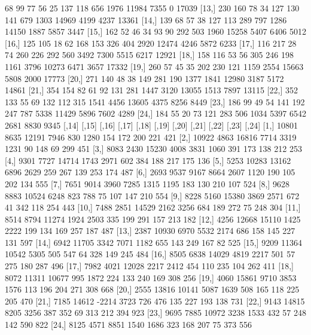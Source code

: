 \documentclass[a4paper]{ article}
\begin{document}
\begin{table}[H]
\begin{Schunk}
\begin{Soutput}
[12,]   68   99   77   56   25  137  118  656 1976 11984  7355     0 17039
[13,]  230  160   78   34  127  130  141  679 1303 14969  4199  4237 13361
[14,]  139   68   57   38  127  113  289  797 1286 14150  1887  5857  3447
[15,]  162   52   46   34   93   90  292  503 1960 15258  5407  6406  5012
[16,]  125  105   18   62  168  153  326  404 2920 12474  4246  5872  6233
[17,]  116  217   28   74  260  226  292  560 3492  7300  5515  6217 12921
[18,]  158  116   53   56  305  246  198 1161 3796 10273  6471  3657 17332
[19,]  260   57   45   35  202  230  121 1159 2554 15663  5808  2000 17773
[20,]  271  140   48   38  149  281  190 1377 1841 12980  3187  5172 14861
[21,]  354  154   82   61   92  131  281 1447 3120 13055  1513  7897 13115
[22,]  352  133   55   69  132  112  315 1541 4456 13605  4375  8256  8449
[23,]  186   99   49   54  141  192  247  787 5338 11429  5896  7602  4289
[24,]  184   55   20   73  121  283  506 1034 5397  6542  2681  8830  9345
      [,14] [,15] [,16] [,17] [,18] [,19] [,20] [,21] [,22] [,23] [,24]
 [1,] 10801  8635 12191  7946   830  1280   154   172   200   221   421
 [2,] 10922  4863 16816  7714  3319  1231    90   148    69   299   451
 [3,]  8083  2430 15230  4008  3831  1060   391   173   138   212   253
 [4,]  9301  7727 14714  1743  2971   602   384   188   217   175   136
 [5,]  5253 10283 13162  6896  2629   259   267   139   253   174   487
 [6,]  2693  9537  9167  8664  2607  1120   190   105   202   134   555
 [7,]  7651  9014  3960  7285  1315  1195   183   130   210   107   524
 [8,]  9628  8883 10524  6248   823   788    75   107   147   210   554
 [9,]  8228  5160 15380  3869  2571   672    41   342   118   254   443
[10,]  7488  2851 14529  2162  3256   684   189   272    75   248   304
[11,]  8514  8794 11274  1924  2503   335   199   291   157   213   182
[12,]  4256 12668 15110  1425  2222   199   134   169   257   187   487
[13,]  2387 10930  6970  5532  2174   686   158   145   227   131   597
[14,]  6942 11705  3342  7071  1182   655   143   249   167    82   525
[15,]  9209 11364 10542  5305   505   547    64   328   149   245   484
[16,]  8505  6838 14029  4819  2217   501    57   275   180   287   496
[17,]  7982  4021 12028  2217  2412   454   110   235   104   262   411
[18,]  8072 11311 10677   995  1872   224   133   240   169   308   256
[19,]  4060 15861  9710  3853  1576   113   196   204   271   308   668
[20,]  2555 13816 10141  5087  1639   508   165   118   225   205   470
[21,]  7185 14612 -2214  3723   726   476   135   227   193   138   731
[22,]  9143 14815  8205  3256   387   352    69   313   212   394   923
[23,]  9695  7885 10972  3238  1533   432    57   248   142   590   822
[24,]  8125  4571  8851  1540  1686   323   168   207    75   373   556
\end{Soutput}
\end{Schunk}
\end{table}
\end{document}

